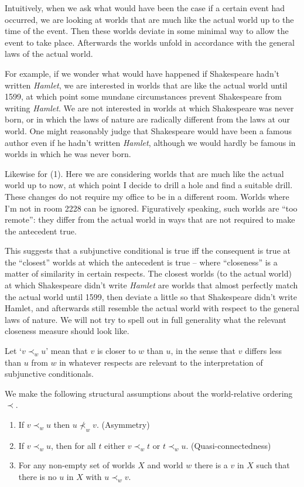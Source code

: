 Intuitively, when we ask what would have been the case if a certain event had
occurred, we are looking at worlds that are much like the actual world up to the
time of the event. Then these worlds deviate in some minimal way to allow the
event to take place. Afterwards the worlds unfold in accordance with the general
laws of the actual world.

For example, if we wonder what would have happened if Shakespeare hadn't written
\emph{Hamlet}, we are interested in worlds that are like the actual world until
1599, at which point some mundane circumstances prevent Shakespeare from writing
\emph{Hamlet}. We are not interested in worlds at which Shakespeare was never
born, or in which the laws of nature are radically different from the laws at
our world. One might reasonably judge that Shakespeare would have been a famous
author even if he hadn't written \emph{Hamlet}, although we would hardly be
famous in worlds in which he was never born.

Likewise for (1). Here we are considering worlds that are much like the actual
world up to now, at which point I decide to drill a hole and find a suitable
drill. These changes do not require my office to be in a different room. Worlds
where I'm not in room 2228 can be ignored. Figuratively speaking, such worlds
are ``too remote'': they differ from the actual world in ways that are not
required to make the antecedent true.

This suggests that a subjunctive conditional is true iff the consequent is true
at the ``closest'' worlds at which the antecedent is true -- where ``closeness''
is a matter of similarity in certain respects. The closest worlds (to the actual
world) at which Shakespeare didn't write \emph{Hamlet} are worlds that almost
perfectly match the actual world until 1599, then deviate a little so that
Shakespeare didn't write Hamlet, and afterwards still resemble the actual world
with respect to the general laws of nature. We will not try to spell out in full
generality what the relevant closeness measure should look like.

Let `$v \prec_w u$' mean that $v$ is closer to $w$ than $u$, in the sense that
$v$ differs less than $u$ from $w$ in whatever respects are relevant to the
interpretation of subjunctive conditionals.

We make the following structural assumptions about the world-relative ordering
$\prec$.

\begin{enumerate}[leftmargin=8mm]
  \itemsep-1mm
  \item If $v \prec_w u$ then $u \nprec_w v$. (Asymmetry)
  \item If $v \prec_w u$, then for all $t$ either $v \prec_w t$ or
        $t \prec_w u$. (Quasi-connectedness)
  \item For any non-empty set of worlds $X$ and world $w$ there is a $v$ in $X$
        such that there is no $u$ in $X$ with $u \prec_w v$.
\end{enumerate}

